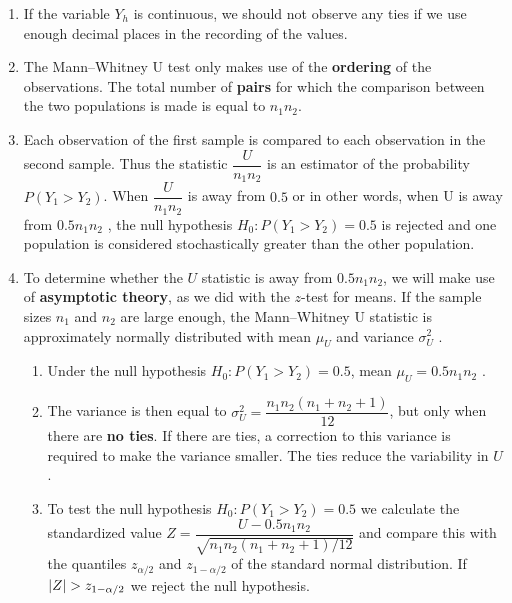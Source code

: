 \begin{enumerate}
    \item  If the variable $Y _h$ is continuous, we should not observe any ties if we use enough decimal places in the recording of the values.
    \hfill \cite{statistics/book/Statistics-for-Data-Scientists/Maurits-Kaptein}

    \item The Mann–Whitney U test only makes use of the \textbf{ordering} of the observations. 
    The total number of \textbf{pairs} for which the comparison between the two populations is made is equal to $n_1n_2 $. 
    \hfill \cite{statistics/book/Statistics-for-Data-Scientists/Maurits-Kaptein}

    \item Each observation of the first sample is compared to each observation in the second sample. 
    Thus the statistic $\dfrac{U}{n_1n_2}$ is an estimator of the probability $P(Y_1 > Y_2)$. 
    When $\dfrac{U}{n_1n_2}$ is away from $0.5$ or in other words, when U is away from $0.5n_1n_2$ , the null hypothesis $H_0 : P(Y_1 > Y_2) = 0.5$ is rejected and one population is considered stochastically greater than the other population.
    \hfill \cite{statistics/book/Statistics-for-Data-Scientists/Maurits-Kaptein}

    \item To determine whether the $U$ statistic is away from $0.5n_1n_2 $, we will make use of \textbf{asymptotic theory}, as we did with the $z$-test for means. 
    If the sample sizes $n_1$ and $n_2$ are large enough, the Mann–Whitney U statistic is approximately normally distributed with mean $\mu_U$ and variance $\sigma^2_U$ . 
    \hfill \cite{statistics/book/Statistics-for-Data-Scientists/Maurits-Kaptein}
    \begin{enumerate}
        \item Under the null hypothesis $H_0 : P(Y_1 > Y_2) = 0.5$, mean $\mu_U = 0.5n_1n_2$ .
        \hfill \cite{statistics/book/Statistics-for-Data-Scientists/Maurits-Kaptein}

        \item The variance is then equal to $\sigma^2 _U = \dfrac{n_1n_2(n_1 + n_2 + 1)}{12}$, but only when there are \textbf{no ties}.
        If there are ties, a correction to this variance is required to make the variance smaller. 
        The ties reduce the variability in $U $.
        \hfill \cite{statistics/book/Statistics-for-Data-Scientists/Maurits-Kaptein}
        
        \item To test the null hypothesis $H_0 : P(Y_1 > Y_2) = 0.5$ we calculate the standardized value $Z = \dfrac{U - 0.5n_1n_2}{\sqrt{n_1n_2(n_1 + n_2 + 1)/12}}$ and compare this with the quantiles $z_{\alpha/2}$ and $z_{1-\alpha/2}$ of the standard normal distribution. 
        If $\left| Z \right| > z_{1-\alpha/2}$ we reject the null hypothesis.
        \hfill \cite{statistics/book/Statistics-for-Data-Scientists/Maurits-Kaptein}
    \end{enumerate}
    
\end{enumerate}



